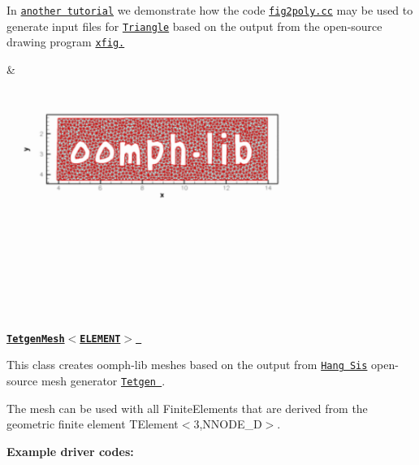 \begin{center}
\begin{longtabu}
\begin{DoxyItemize}
\item In \href{../../mesh_from_xfig/html/index.html}{\tt another tutorial} we demonstrate how the code \href{../../../../demo_drivers/meshing/mesh_from_xfig_triangle/fig2poly.cc}{\tt fig2poly.\+cc} may be used to generate input files for \href{http://www.cs.cmu.edu/~quake/triangle.html}{\tt {\ttfamily Triangle}} based on the output from the open-\/source drawing program \href{http://en.wikipedia.org/wiki/Xfig}{\tt xfig.}
\end{DoxyItemize}& 
\begin{DoxyImageNoCaption}
  \mbox{\includegraphics[width=0.75\textwidth]{oomph_mesh}}
\end{DoxyImageNoCaption}
   \\
\href{../../mesh_from_tetgen/html/index.html}{\tt {\bfseries  Tetgen\+Mesh$<$\+E\+L\+E\+M\+E\+N\+T$>$ }} ~\newline
~\newline

\begin{DoxyItemize}
\item This class creates {\ttfamily oomph-\/lib} meshes based on the output from \href{http://www.wias-berlin.de/~si }{\tt Hang Si\textquotesingle{}s} open-\/source mesh generator \href{http://wias-berlin.de/software/tetgen//}{\tt {\ttfamily Tetgen} }.
\item The mesh can be used with all {\ttfamily Finite\+Elements} that are derived from the geometric finite element {\ttfamily T\+Element$<$3,\+N\+N\+O\+D\+E\+\_\+D$>$}.
\end{DoxyItemize}{\bfseries Example driver codes\+:} ~\newline


\end{longtabu}
\end{center}
